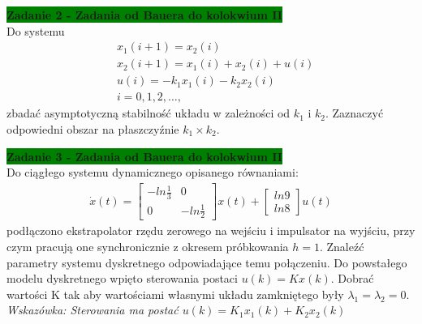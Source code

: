 \documentclass[a4paper,11pt]{article}
\begin{document}
\begin{framed}
\textbf{\colorbox{green}{Zadanie 2 - Zadania od Bauera do kolokwium II }} \\ 
Do systemu
\begin{align*}
& x_{1}(i+1)=x_{2}(i) \\
& x_{2}(i+1)=x_{1}(i)+x_{2}(i)+u(i) \\
& u(i) = -k_{1}x_{1}(i)-k_{2}x_{2}(i) \\
& i = 0, 1, 2, \dots,
\end{align*}
zbadać asymptotyczną stabilność układu w zależności od \( k_{1} \) i \( k_{2} \). Zaznaczyć odpowiedni obszar na płaszczyźnie \( k_{1} \times k_{2} \).
\end{framed}

\begin{framed}
\textbf{\colorbox{green}{Zadanie 3 - Zadania od Bauera do kolokwium II} } \\ 
Do ciągłego systemu dynamicznego opisanego równaniami: 
\begin{align*}
\dot{x}(t) =
\begin{bmatrix}
-ln\frac{1}{3} & 0 \\
0 & -ln\frac{1}{2}
\end{bmatrix}
x(t)+
\begin{bmatrix}
ln9 \\
ln 8
\end{bmatrix}
u(t)
\end{align*}
podłączono ekstrapolator rzędu zerowego na wejściu i impulsator na wyjściu, przy czym pracują one synchronicznie z okresem próbkowania \( h = 1 \). Znaleźć parametry systemu dyskretnego odpowiadające temu połączeniu. Do powstałego modelu dyskretnego wpięto sterowania postaci \( u(k)= Kx(k) \). Dobrać wartości K tak aby wartościami własnymi układu zamkniętego były \( \lambda_{1} = \lambda_{2} = 0 \). \\ 
\textit{Wskazówka: Sterowania ma postać \( u(k) = K_{1}x_{1}(k)+K_{2}x_{2}(k)\)}
\end{framed}
\end{document}
